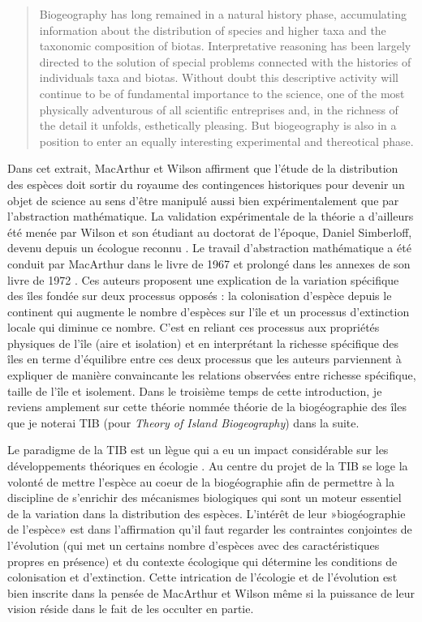 \begin{quote}
Biogeography has long remained in a natural history phase, accumulating
information about the distribution of species and higher taxa and the
taxonomic composition of biotas. Interpretative reasoning has been
largely directed to the solution of special problems connected with the
histories of individuals taxa and biotas. Without doubt this descriptive
activity will continue to be of fundamental importance to the science,
one of the most physically adventurous of all scientific entreprises
and, in the richness of the detail it unfolds, esthetically pleasing.
But biogeography is also in a position to enter an equally interesting
experimental and thereotical phase.
\end{quote}

Dans cet extrait, MacArthur et Wilson affirment que l'étude de la
distribution des espèces doit sortir du royaume des contingences
historiques pour devenir un objet de science au sens d'être manipulé
aussi bien expérimentalement que par l'abstraction mathématique. La
validation expérimentale de la théorie a d'ailleurs été menée par Wilson
et son étudiant au doctorat de l'époque, Daniel Simberloff, devenu
depuis un écologue reconnu \citep{Simberloff1969}. Le travail
d'abstraction mathématique a été conduit par MacArthur dans le livre de
1967 et prolongé dans les annexes de son livre de 1972
\citep{macarthur1972geographical}. Ces auteurs proposent une explication
de la variation spécifique des îles fondée sur deux processus opposés :
la colonisation d'espèce depuis le continent qui augmente le nombre
d'espèces sur l'île et un processus d'extinction locale qui diminue ce
nombre. C'est en reliant ces processus aux propriétés physiques de l'île
(aire et isolation) et en interprétant la richesse spécifique des îles
en terme d'équilibre entre ces deux processus que les auteurs
parviennent à expliquer de manière convaincante les relations observées
entre richesse spécifique, taille de l'île et isolement. Dans le
troisième temps de cette introduction, je reviens amplement sur cette
théorie nommée théorie de la biogéographie des îles que je noterai TIB
(pour \emph{Theory of Island Biogeography}) dans la suite.

Le paradigme de la TIB est un lègue qui a eu un impact considérable sur
les développements théoriques en écologie \citep{Warren2015}. Au centre
du projet de la TIB se loge la volonté de mettre l'espèce au coeur de la
biogéographie afin de permettre à la discipline de s'enrichir des
mécanismes biologiques qui sont un moteur essentiel de la variation dans
la distribution des espèces. L'intérêt de leur »biogéographie de
l'espèce» \citep[le terme est mentionné à l'avant-dernière phrase de
l'ouvrage][p.183]{MacArthur1967} est dans l'affirmation qu'il faut
regarder les contraintes conjointes de l'évolution (qui met un certains
nombre d'espèces avec des caractéristiques propres en présence) et du
contexte écologique qui détermine les conditions de colonisation et
d'extinction. Cette intrication de l'écologie et de l'évolution est bien
inscrite dans la pensée de MacArthur et Wilson même si la puissance de
leur vision réside dans le fait de les occulter en partie.

